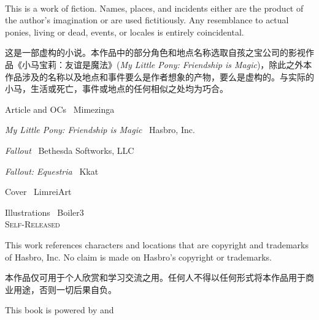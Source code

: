 \newpage

~\vfill

\thispagestyle{empty}

\begin{englishpar}
\noindent This is a work of fiction. Names, places, and incidents either are the product of the author's imagination or are used fictitiously. Any resemblance to actual ponies, living or dead, events, or locales is entirely coincidental.
\end{englishpar}

\noindent 这是一部虚构的小说。本作品中的部分角色和地点名称选取自孩之宝公司的影视作品《小马宝莉：友谊是魔法》(\emph{My Little Pony: Friendship is Magic})，除此之外本作品涉及的名称以及地点和事件要么是作者想象的产物，要么是虚构的。与实际的小马，生活或死亡，事件或地点的任何相似之处均为巧合。\\

\begin{englishpar}
\noindent Article and OCs \textcopyright\ Mimezinga

\noindent \emph{My Little Pony: Friendship is Magic} \textcopyright\ Hasbro, Inc.

\noindent \emph{Fallout} \textcopyright\ Bethesda Softworks, LLC

\noindent \emph{Fallout: Equestria} \textcopyright\ Kkat

\noindent Cover \textcopyright\ LimreiArt

\noindent Illustrations \textcopyright\ Boiler3 \\

\noindent \textsc{Self-Released}\\
\end{englishpar}

\begin{englishpar}
\noindent This work references characters and locations that are copyright and trademarks of Hasbro, Inc. No claim is made on Hasbro's copyright or trademarks.
\end{englishpar}

\noindent 本作品仅可用于个人欣赏和学习交流之用。任何人不得以任何形式将本作品用于商业用途，否则一切后果自负。\\

\begin{englishpar}
\noindent This book is powered by \XeLaTeX{} and \CTeX{}
\end{englishpar}

